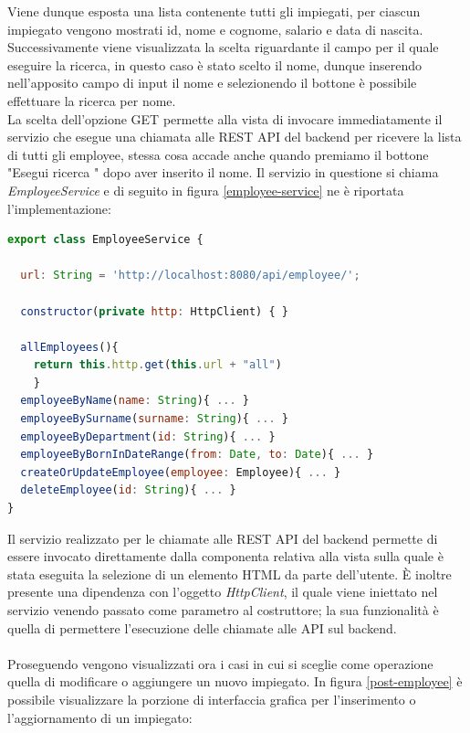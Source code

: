 \FloatBarrier
Viene dunque esposta una lista contenente tutti gli impiegati, per ciascun impiegato vengono mostrati id, nome e cognome, salario e data di nascita. Successivamente viene visualizzata la scelta riguardante il campo per il quale eseguire la ricerca, in questo caso è stato scelto il nome, dunque inserendo nell'apposito campo di input il nome e selezionendo il bottone è possibile effettuare la ricerca per nome.\\
La scelta dell'opzione GET permette alla vista di invocare immediatamente il servizio che esegue una chiamata alle REST API del backend per ricevere la lista di tutti gli employee, stessa cosa accade anche quando premiamo il bottone "Esegui ricerca " dopo aver inserito il nome. Il servizio in questione si chiama \textit{EmployeeService} e di seguito in figura \ref{employee-service} ne è riportata l'implementazione:
\begin{lstlisting}[language=JavaScript]
export class EmployeeService {

  url: String = 'http://localhost:8080/api/employee/';

  constructor(private http: HttpClient) { }

  allEmployees(){
    return this.http.get(this.url + "all")
    }
  employeeByName(name: String){ ... }
  employeeBySurname(surname: String){ ... }
  employeeByDepartment(id: String){ ... }
  employeeByBornInDateRange(from: Date, to: Date){ ... }
  createOrUpdateEmployee(employee: Employee){ ... }
  deleteEmployee(id: String){ ... }
}
\end{lstlisting}
Il servizio realizzato per le chiamate alle REST API del backend permette di essere invocato direttamente dalla componenta relativa alla vista sulla quale è stata eseguita la selezione di un elemento HTML da parte dell'utente. È inoltre presente una dipendenza con l'oggetto \textit{HttpClient}, il quale viene iniettato nel servizio venendo passato come parametro al costruttore; la sua funzionalità è quella di permettere l'esecuzione delle chiamate alle API sul backend.\\\\
Proseguendo vengono visualizzati ora i casi in cui si sceglie come operazione quella di modificare o aggiungere un nuovo impiegato. In figura \ref{post-employee} è possibile visualizzare la porzione di interfaccia grafica per l'inserimento o l'aggiornamento di un impiegato:
